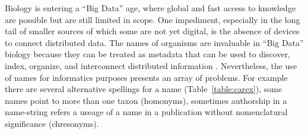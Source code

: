 \documentclass{bmcart}
\begin{document}



Biology is entering a ``Big Data'' age, where global and fast access to
knowledge are possible but are still limited in scope. One impediment, especially in the long tail of smaller sources of which some are not yet digital, is the absence of devices to connect distributed data.  The names of organisms are invaluable in ``Big
Data'' biology because they can be treated as metadata that can be used to discover, index, organize, and
interconnect distributed information \cite{Patterson2010}.  Nevertheless, the use
of names for informatics purposes presents an array of problems. For example
there are several alternative spellings for a name (Table~\ref{table:carex}),
some names point to more than one taxon (homonyms), sometimes authorship in a
name-string refers a useage of a name in a publication without nomenclatural significance (chresonyms).
\end{document}
